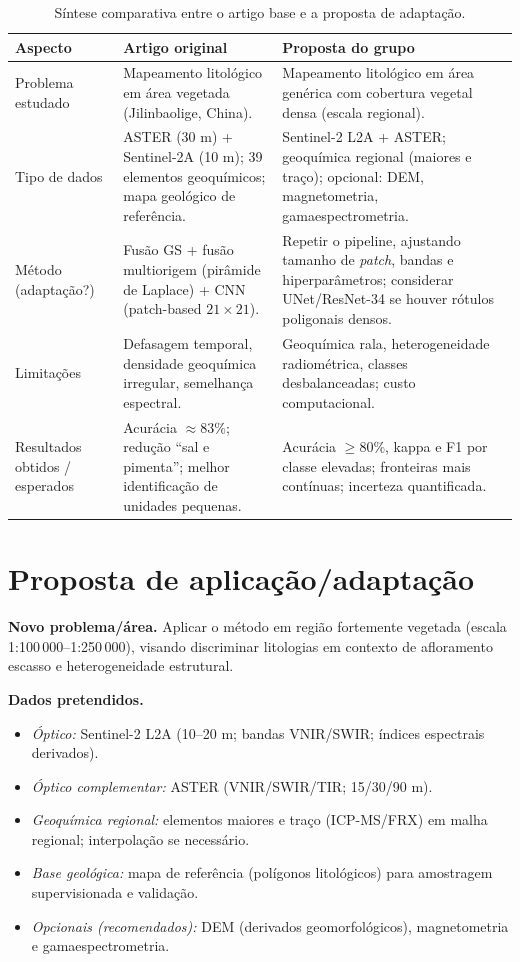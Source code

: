 \documentclass[12pt,a4paper]{article}
\begin{document}
\begin{table}[htbp]
\centering
\caption{Síntese comparativa entre o artigo base e a proposta de adaptação.}
\label{tab:comparativa}
\renewcommand{\arraystretch}{1.25}
\begin{tabular}{>{\raggedright\arraybackslash}p{3.2cm} >{\raggedright\arraybackslash}p{6.1cm} >{\raggedright\arraybackslash}p{6.1cm}}
\toprule
\textbf{Aspecto} & \textbf{Artigo original} & \textbf{Proposta do grupo} \\
\midrule
Problema estudado & Mapeamento litológico em área vegetada (Jilinbaolige, China). & Mapeamento litológico em área genérica com cobertura vegetal densa (escala regional). \\
Tipo de dados & ASTER (30 m) + Sentinel-2A (10 m); 39 elementos geoquímicos; mapa geológico de referência. & Sentinel-2 L2A + ASTER; geoquímica regional (maiores e traço); opcional: DEM, magnetometria, gamaespectrometria. \\
Método (adaptação?) & Fusão GS + fusão multiorigem (pirâmide de Laplace) + CNN (patch-based $21\times 21$). & Repetir o pipeline, ajustando tamanho de \emph{patch}, bandas e hiperparâmetros; considerar UNet/ResNet-34 se houver rótulos poligonais densos. \\
Limitações & Defasagem temporal, densidade geoquímica irregular, semelhança espectral. & Geoquímica rala, heterogeneidade radiométrica, classes desbalanceadas; custo computacional. \\
Resultados obtidos / esperados & Acurácia $\approx 83\%$; redução ``sal e pimenta''; melhor identificação de unidades pequenas. & Acurácia $\geq 80\%$, kappa e F1 por classe elevadas; fronteiras mais contínuas; incerteza quantificada. \\
\bottomrule
\end{tabular}
\end{table}

\section{Proposta de aplicação/adaptação}
\textbf{Novo problema/área.} Aplicar o método em região fortemente vegetada (escala 1:100\,000--1:250\,000), visando discriminar litologias em contexto de afloramento escasso e heterogeneidade estrutural.

\textbf{Dados pretendidos.}
\begin{itemize}[leftmargin=1.2cm]
  \item \textit{Óptico:} Sentinel-2 L2A (10--20 m; bandas VNIR/SWIR; índices espectrais derivados).
  \item \textit{Óptico complementar:} ASTER (VNIR/SWIR/TIR; 15/30/90 m).
  \item \textit{Geoquímica regional:} elementos maiores e traço (ICP-MS/FRX) em malha regional; interpolação se necessário.
  \item \textit{Base geológica:} mapa de referência (polígonos litológicos) para amostragem supervisionada e validação.
  \item \textit{Opcionais (recomendados):} DEM (derivados geomorfológicos), magnetometria e gamaespectrometria.
\end{itemize}
\end{document}
